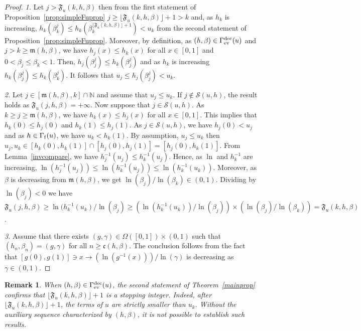 \documentclass{article}
\def\funset{\Gamma}
\def\fmong{\funset_{{\rm ev}}^{\rm dec}}
\def\fset{\Omega([0,1])}
\def\mon{\mathfrak{m}}
\def\cst{\mathfrak{c}}
\def\secfunh{\funset_{\rm f}}
\def\Fu{\mathfrak{F}_u}
\def\nn{\mathbb N}
\def\res{\mathcal{S}}
\newtheorem{remark}{Remark}
\def\red#1{#1}
\def\blue#1{#1}
\begin{document}
	\begin{proof}	
		\emph{1.} Let $j>\Fu(k,h,\beta)$ then \blue{from the first statement of Proposition~\ref{prop:simpleFuprop}} $j\geq \lfloor \Fu(k,h,\beta)\rfloor+1> k$ and, as $h_k$ is increasing, $h_k(\beta_k^j)\leq h_k(\beta_k^{\lfloor \Fu(k,h,\beta)\rfloor+1})<u_k$ from the second statement \blue{of Proposition~\ref{prop:simpleFuprop}}. Moreover, by definition, as $(h,\beta)\in\fmong(u)$ and $j>k\geq \mon(h,\beta)$, we have $h_j(x)\leq h_k(x)$ for all $x\in [0,1]$ and $0<\beta_j\leq \beta_k<1$. Then, $h_j(\beta_j^j)\leq h_k(\beta_j^j)$ and as $h_k$ is increasing $h_k(\beta_j^j)\leq h_k(\beta_k^j)$. It follows that $u_j\leq h_j(\beta_j^j)<u_k$.
		
		\emph{2.} Let $j \red{\in} [\mon(h,\beta),k]\cap \nn$ and assume that $u_j\leq u_k$. If $j\notin \res(u,h)$, the result holds as $\Fu(j,h,\beta)=+\infty$. Now suppose that $j\in\res(u,h)$. As $k  \red{\geq} j\geq \mon(h,\beta)$, we have $h_k(x)\leq h_j(x)$ for all $x\in [0,1]$. This implies that $h_k(0)\leq h_j(0)$ and $h_k(1)\leq h_j(1)$. As $j\in\res(u,h)$, we have $h_j(0)<u_j$ and as $h\in\secfunh(u)$, we have $u_k< h_k(1)$. By assumption, $u_j\leq u_k$ then $u_j,u_k\in \blue{[h_k(0),h_k(1)]\cap [h_j(0),h_j(1)]}=[h_j(0),h_k(1)]$. From Lemma~\ref{invcompare}, we have $h_j^{-1}(u_j)\leq h_k^{-1}(u_j)$.  Hence, as $\ln$ and $h_k^{-1}$ are increasing, $\ln (h_j^{-1}(u_j))\leq \ln (h_k^{-1}(u_j))\leq \ln(h_k^{-1}(u_k))$. Moreover, as $\beta$ is decreasing from $\mon(h,\beta)$, we get $\ln(\beta_j)/\ln(\beta_k)\in (0,1)$. Dividing by $\ln(\beta_j)<0$ we have $\Fu(j,h,\beta)\geq \ln(h_k^{-1}(u_k)/\ln(\beta_j)\geq  (\ln(h_k^{-1}(u_k))/\ln(\beta_j))\times (\ln(\beta_j)/\ln(\beta_k))=\Fu(k,h,\beta)$. 
		
		\emph{3.} Assume that there exists $(g,\gamma)\in\fset\times (0,1)$ such that $(h_n,\beta_n)=(g,\gamma)$ for all $n\geq \cst(h,\beta)$. The conclusion follows from the fact that $[g(0),g(1)]\ni x\to (\ln (g^{-1}(x)))/\ln(\gamma)$ is decreasing  as $\gamma\in (0,1)$.
	\end{proof}
	
	\begin{remark}
 When $(h,\beta)\in\fmong(u)$, \blue{the second statement of Theorem~\ref{mainprop} confirms that $\lfloor \Fu(k,h,\beta)\rfloor+1$ is a stopping integer. Indeed, after} $\lfloor\Fu(k,h,\beta)\rfloor+1$, the terms of $u$ are strictly smaller than $u_k$. Without the auxiliary sequence characterized by $(h,\beta)$, it is not possible to establish such results.
	\end{remark}
	
\end{document}

